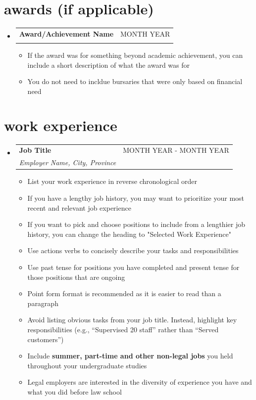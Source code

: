 \documentclass[letterpaper,11pt]{article}
\makeatletter
\newcommand{\resumeItem}[1]{
  \item\small{
    {#1 \vspace{-4pt}}
  }
}
\newcommand{\resumeSubheading}[4]{
  \vspace{-2pt}\item
    \begin{tabular*}{0.97\textwidth}[t]{l@{\extracolsep{\fill}}r}
      \vspace{-2pt}
      \textbf{#1} & #2 \\
      \vspace{-1pt}
      \textit{\small#3} & \textit{\small #4} \\
    \end{tabular*}\vspace{-7pt}
}
\newcommand{\resumeSubSubheading}[2]{
    \item
    \begin{tabular*}{0.97\textwidth}{l@{\extracolsep{\fill}}r}
      \textit{\small#1} & \textit{\small #2} \\
    \end{tabular*}\vspace{-7pt}
}
\newcommand{\resumeSubHeadingListStart}{\begin{itemize}[leftmargin=0.15in, label={}]}
\newcommand{\resumeSubHeadingListEnd}{\end{itemize}}
\newcommand{\resumeItemListStart}{\begin{itemize}}
\newcommand{\resumeItemListEnd}{\end{itemize}\vspace{-5pt}}
\makeatother
\begin{document}
\section{awards (if applicable)}
  \resumeSubHeadingListStart
    \resumeSubheading{Award/Achievement Name}{MONTH YEAR}{}{}
    \vspace{-8pt}
    \resumeItemListStart
      \resumeItem{If the award was for something beyond academic achievement, you can include a short description of what the award was for}
      \resumeItem{You do not need to incldue bursaries that were only based on financial need}
    \resumeItemListEnd
  \resumeItemListEnd
  \vspace{-4pt}

\section{work experience}
  \resumeSubHeadingListStart
    \resumeSubheading
      {Job Title}{MONTH YEAR - MONTH YEAR}
      {Employer Name, City, Province}{}
      \resumeItemListStart
        \resumeItem{List your work experience in reverse chronological order}
        \resumeItem{If you have a lengthy job history, you may want to prioritize your most recent and relevant job experience}
        \resumeItem{If you want to pick and choose positions to include from a lengthier job history, you can change the heading to "Selected Work Experience"}
        \resumeItem{Use actions verbs to concisely describe your tasks and responsibilities}
        \resumeItem{Use past tense for positions you have completed and present tense for those positions that are ongoing}
        \resumeItem{Point form format is recommended as it is easier to read than a paragraph}
        \resumeItem{Avoid listing obvious tasks from your job title. Instead, highlight key responsibilities (e.g., “Supervised 20 staff” rather than “Served customers”)}
        \resumeItem{Include \textbf{summer, part-time and other non-legal jobs} you held throughout your undergraduate studies}
        \resumeItem{Legal employers are interested in the diversity of experience you have and what you did before law school}

      \resumeItemListEnd
      
  \resumeSubHeadingListEnd
\end{document}
